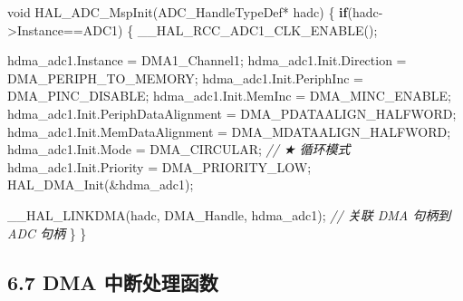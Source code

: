 \documentclass[
  chinese,
  UTF8,
  oneside,
  openany]{ctexbook}
\newenvironment{Shaded}{}{}
\newcommand{\CommentTok}[1]{\textcolor[rgb]{0.38,0.63,0.69}{\textit{#1}}}
\newcommand{\ControlFlowTok}[1]{\textcolor[rgb]{0.00,0.44,0.13}{\textbf{#1}}}
\newcommand{\DataTypeTok}[1]{\textcolor[rgb]{0.56,0.13,0.00}{#1}}
\newcommand{\NormalTok}[1]{#1}
\newcommand{\OperatorTok}[1]{\textcolor[rgb]{0.40,0.40,0.40}{#1}}
\begin{document}
\begin{Shaded}
\begin{Highlighting}[]
\DataTypeTok{void}\NormalTok{ HAL\_ADC\_MspInit}\OperatorTok{(}\NormalTok{ADC\_HandleTypeDef}\OperatorTok{*}\NormalTok{ hadc}\OperatorTok{)}
\OperatorTok{\{}
    \ControlFlowTok{if}\OperatorTok{(}\NormalTok{hadc}\OperatorTok{{-}\textgreater{}}\NormalTok{Instance}\OperatorTok{==}\NormalTok{ADC1}\OperatorTok{)}
    \OperatorTok{\{}
\NormalTok{        \_\_HAL\_RCC\_ADC1\_CLK\_ENABLE}\OperatorTok{();}

\NormalTok{        hdma\_adc1}\OperatorTok{.}\NormalTok{Instance }\OperatorTok{=}\NormalTok{ DMA1\_Channel1}\OperatorTok{;}
\NormalTok{        hdma\_adc1}\OperatorTok{.}\NormalTok{Init}\OperatorTok{.}\NormalTok{Direction }\OperatorTok{=}\NormalTok{ DMA\_PERIPH\_TO\_MEMORY}\OperatorTok{;}
\NormalTok{        hdma\_adc1}\OperatorTok{.}\NormalTok{Init}\OperatorTok{.}\NormalTok{PeriphInc }\OperatorTok{=}\NormalTok{ DMA\_PINC\_DISABLE}\OperatorTok{;}
\NormalTok{        hdma\_adc1}\OperatorTok{.}\NormalTok{Init}\OperatorTok{.}\NormalTok{MemInc }\OperatorTok{=}\NormalTok{ DMA\_MINC\_ENABLE}\OperatorTok{;}
\NormalTok{        hdma\_adc1}\OperatorTok{.}\NormalTok{Init}\OperatorTok{.}\NormalTok{PeriphDataAlignment }\OperatorTok{=}\NormalTok{ DMA\_PDATAALIGN\_HALFWORD}\OperatorTok{;}
\NormalTok{        hdma\_adc1}\OperatorTok{.}\NormalTok{Init}\OperatorTok{.}\NormalTok{MemDataAlignment }\OperatorTok{=}\NormalTok{ DMA\_MDATAALIGN\_HALFWORD}\OperatorTok{;}
\NormalTok{        hdma\_adc1}\OperatorTok{.}\NormalTok{Init}\OperatorTok{.}\NormalTok{Mode }\OperatorTok{=}\NormalTok{ DMA\_CIRCULAR}\OperatorTok{;}     \CommentTok{// ★ 循环模式}
\NormalTok{        hdma\_adc1}\OperatorTok{.}\NormalTok{Init}\OperatorTok{.}\NormalTok{Priority }\OperatorTok{=}\NormalTok{ DMA\_PRIORITY\_LOW}\OperatorTok{;}
\NormalTok{        HAL\_DMA\_Init}\OperatorTok{(\&}\NormalTok{hdma\_adc1}\OperatorTok{);}

\NormalTok{        \_\_HAL\_LINKDMA}\OperatorTok{(}\NormalTok{hadc}\OperatorTok{,}\NormalTok{ DMA\_Handle}\OperatorTok{,}\NormalTok{ hdma\_adc1}\OperatorTok{);}  \CommentTok{// 关联 DMA 句柄到 ADC 句柄}
    \OperatorTok{\}}
\OperatorTok{\}}
\end{Highlighting}
\end{Shaded}

\subsection{6.7 DMA
中断处理函数}\label{dma-ux4e2dux65adux5904ux7406ux51fdux6570}
\end{document}
